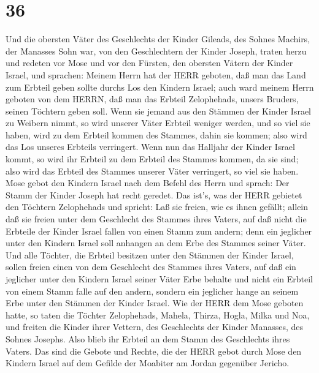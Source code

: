 \hypertarget{section-35}{%
\section{36}\label{section-35}}

 Und die obersten Väter des Geschlechts der Kinder Gileads,
des Sohnes Machirs, der Manasses Sohn war, von den Geschlechtern der
Kinder Joseph, traten herzu und redeten vor Mose und vor den Fürsten,
den obersten Vätern der Kinder Israel,  und sprachen: Meinem
Herrn hat der HERR geboten, daß man das Land zum Erbteil geben sollte
durchs Los den Kindern Israel; auch ward meinem Herrn geboten von dem
HERRN, daß man das Erbteil Zelophehads, unsers Bruders, seinen Töchtern
geben soll.  Wenn sie jemand aus den Stämmen der Kinder
Israel zu Weibern nimmt, so wird unserer Väter Erbteil weniger werden,
und so viel sie haben, wird zu dem Erbteil kommen des Stammes, dahin sie
kommen; also wird das Los unseres Erbteils verringert.  Wenn
nun das Halljahr der Kinder Israel kommt, so wird ihr Erbteil zu dem
Erbteil des Stammes kommen, da sie sind; also wird das Erbteil des
Stammes unserer Väter verringert, so viel sie haben.  Mose
gebot den Kindern Israel nach dem Befehl des Herrn und sprach: Der Stamm
der Kinder Joseph hat recht geredet.  Das ist's, was der
HERR gebietet den Töchtern Zelophehads und spricht: Laß sie freien, wie
es ihnen gefällt; allein daß sie freien unter dem Geschlecht des Stammes
ihres Vaters,  auf daß nicht die Erbteile der Kinder Israel
fallen von einen Stamm zum andern; denn ein jeglicher unter den Kindern
Israel soll anhangen an dem Erbe des Stammes seiner Väter. 
Und alle Töchter, die Erbteil besitzen unter den Stämmen der Kinder
Israel, sollen freien einen von dem Geschlecht des Stammes ihres Vaters,
auf daß ein jeglicher unter den Kindern Israel seiner Väter Erbe behalte
 und nicht ein Erbteil von einem Stamm falle auf den andern,
sondern ein jeglicher hange an seinem Erbe unter den Stämmen der Kinder
Israel.  Wie der HERR dem Mose geboten hatte, so taten die
Töchter Zelophehads,  Mahela, Thirza, Hogla, Milka und Noa,
und freiten die Kinder ihrer Vettern,  des Geschlechts der
Kinder Manasses, des Sohnes Josephs. Also blieb ihr Erbteil an dem Stamm
des Geschlechts ihres Vaters.  Das sind die Gebote und
Rechte, die der HERR gebot durch Mose den Kindern Israel auf dem Gefilde
der Moabiter am Jordan gegenüber Jericho.

